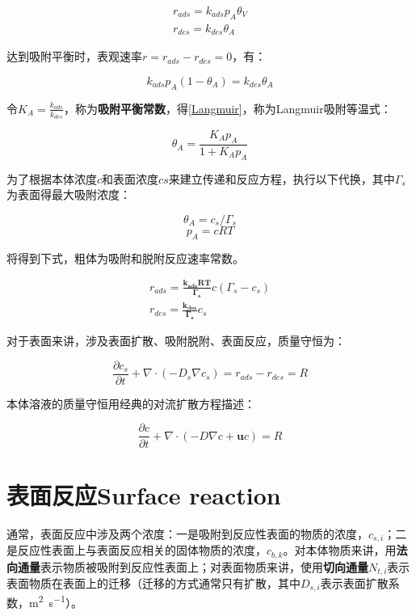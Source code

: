 \begin{gather}
    r_{ads} = k_{ads}p_A\theta_V \\
    r_{des} = k_{des}\theta_A
\end{gather}

达到吸附平衡时，表观速率$ r=r_{ads}-r_{des}=0 $，有：

\[k_{ads}p_A(1-\theta_A)=k_{des}\theta_A\]

令$ K_A=\frac{k_{ads}}{k_{des}} $，称为\textbf{吸附平衡常数}，得\autoref{Langmuir}，称为Langmuir吸附等温式：

\begin{equation}\label{Langmuir}
    \theta_A = \frac{K_Ap_A}{1+K_Ap_A}
\end{equation}

为了根据本体浓度$ c $和表面浓度$ cs $来建立传递和反应方程，执行以下代换，其中$ \Gamma_s $为表面得最大吸附浓度：

\[\theta_A = c_s/\Gamma_s\]
\[p_A=cRT\]

将得到下式，粗体为吸附和脱附反应速率常数。

\begin{gather}
    r_{ads} = \bm{\frac{k_{ads}RT}{\Gamma_s}}c(\Gamma_s-c_s)\\
    r_{des} = \bm{\frac{k_{des}}{\Gamma_s}}c_s
\end{gather}

对于表面来讲，涉及表面扩散、吸附脱附、表面反应，质量守恒为：

\begin{equation}
    \frac{\partial c_s}{\partial t}+\nabla\cdot(-D_s\nabla c_s) = r_{ads}-r_{des}=R
\end{equation}

本体溶液的质量守恒用经典的对流扩散方程描述：

\begin{equation}
    \frac{\partial c}{\partial t} + \nabla\cdot(-D\nabla c+\bm{u}c) = R
\end{equation}

\section{表面反应Surface reaction}

通常，表面反应中涉及两个浓度：一是吸附到反应性表面的物质的浓度，$ c_{s,i} $；二是反应性表面上与表面反应相关的固体物质的浓度，$ c_{b,k} $。对本体物质来讲，用\textbf{法向通量}表示物质被吸附到反应性表面上；对表面物质来讲，使用\textbf{切向通量}$ N_{t,i} $表示表面物质在表面上的迁移（迁移的方式通常只有扩散，其中$ D_{s,i} $表示表面扩散系数，\si{\meter\squared\per\second}）。

